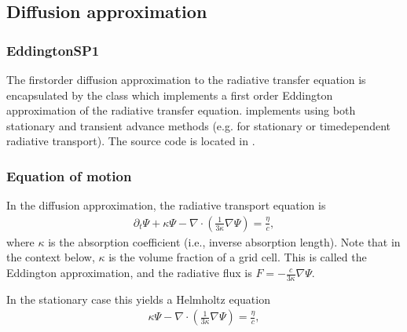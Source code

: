 \documentclass[letterpaper,10pt,english]{sphinxmanual}
\begin{document}
\subsection{Diffusion approximation}
\label{\detokenize{Solvers/RTE:diffusion-approximation}}\label{\detokenize{Solvers/RTE:chap-diffusionrte}}

\subsubsection{EddingtonSP1}
\label{\detokenize{Solvers/RTE:eddingtonsp1}}
\sphinxAtStartPar
The first\sphinxhyphen{}order diffusion approximation to the radiative transfer equation is encapsulated by the  class which implements a first order Eddington approximation of the radiative transfer equation.
 implements  using both stationary and transient advance methods (e.g. for stationary or time\sphinxhyphen{}dependent radiative transport).
The source code is located in .


\subsubsection{Equation of motion}
\label{\detokenize{Solvers/RTE:equation-of-motion}}
\sphinxAtStartPar
In the diffusion approximation, the radiative transport equation is
\begin{equation}\label{equation:Solvers/RTE:TransientDiffusionRTE}
\begin{split}\partial_t\Psi + \kappa\Psi - \nabla\cdot\left(\frac{1}{3\kappa}\nabla\Psi\right) = \frac{\eta}{c},\end{split}
\end{equation}
\sphinxAtStartPar
where \(\kappa\) is the absorption coefficient (i.e., inverse absorption length).
Note that in the context below, \(\kappa\) is  the volume fraction of a grid cell.
This is called the Eddington approximation, and the radiative flux is \(F = -\frac{c}{3\kappa}\nabla \Psi\).

\sphinxAtStartPar
In the stationary case this yields a Helmholtz equation
\begin{equation}\label{equation:Solvers/RTE:StationaryDiffusionRTE}
\begin{split}\kappa\Psi - \nabla\cdot\left(\frac{1}{3\kappa}\nabla\Psi\right) = \frac{\eta}{c},\end{split}
\end{equation}
\end{document}
